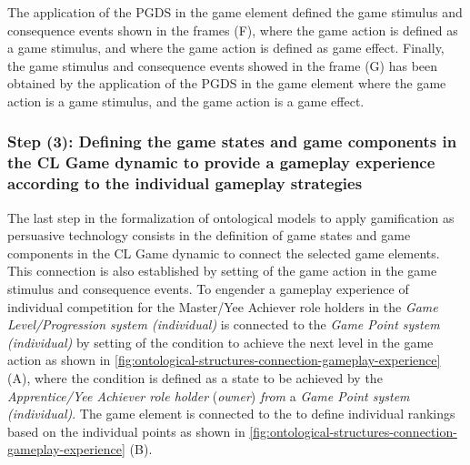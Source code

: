 The application of the PGDS  in the game element  defined the game stimulus and consequence events shown in the frames (F), where the game action  is defined as a game stimulus, and where the game action  is defined as game effect.
Finally, the game stimulus and consequence events showed in the frame (G) has been obtained by the application of the PGDS  in the game element  where the game action  is a game stimulus, and the game action  is a game effect.

\subsubsection*{Step (3): Defining the game states and game components in the CL Game dynamic to provide a gameplay experience according to the individual gameplay strategies}
 
The last step in the formalization of ontological models to apply gamification as persuasive technology consists in the definition of game states and game components in the CL Game dynamic to connect the selected game elements. This connection is also established by setting of the game action in the game stimulus and consequence events.
To engender a gameplay experience of individual competition for the Master/Yee Achiever role holders in the  \emph{Game Level/Progression system (individual)} is connected to the \emph{Game Point system (individual)} by setting of the condition to achieve the next level in the game action  as shown in \autoref{fig:ontological-structures-connection-gameplay-experience} (A), where the condition  is defined as a state to be achieved by the \emph{Apprentice/Yee Achiever role holder} (\emph{owner}) \emph{from} a \emph{Game Point system (individual)}.
The game element  is connected to the  to define individual rankings based on the individual points as shown in \autoref{fig:ontological-structures-connection-gameplay-experience} (B).

